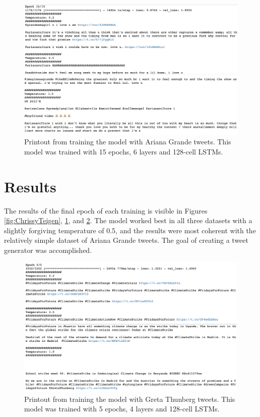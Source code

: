 \documentclass[%
 reprint,
 amsmath,amssymb,
 aps,
]{revtex4-2}
\begin{document}
\begin{figure}[h]
    \centering
    \includegraphics[scale=0.28]{ArianaGrandeResults.png}
    \caption{Printout from training the model with Ariana Grande tweets. This model was trained with 15 epochs, 6 layers and 128-cell LSTMs.}
    \label{fig:ArianaGrande}
\end{figure}

\section{Results}

The results of the final epoch of each training is visible in Figures \ref{fig:ChrissyTeigen}, \ref{fig:ArianaGrande}, and \ref{fig:GretaThunberg}. The model worked best in all three datasets with a slightly forgiving temperature of 0.5, and the results were most coherent with the relatively simple dataset of Ariana Grande tweets. The goal of creating a tweet generator was accomplished.

\begin{figure}
    \centering
    \includegraphics[scale=0.28]{GretaThunbergResults.png}
    \caption{Printout from training the model with Greta Thunberg tweets. This model was trained with 5 epochs, 4 layers and 128-cell LSTMs.}
    \label{fig:GretaThunberg}
\end{figure}
\end{document}
